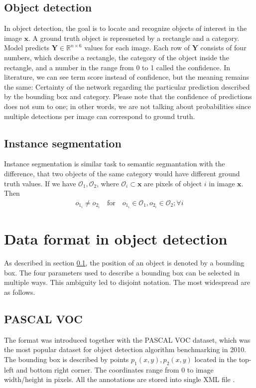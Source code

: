 \subsection{Object detection}
\label{subsec:object_detection}
In object detection, the goal is to locate and recognize objects of interest in the image $\mathbf{x}$. A ground truth object is represneted by a rectangle and a category. Model predicts $\mathbf{Y} \in \mathbb{R}^{n \times 6}$ values for each image. Each row of $\mathbf{Y}$ consists of four numbers, which describe a rectangle, the category of the object inside the rectangle, and a number in the range from 0 to 1 called the confidence. In literature, we can see term score instead of confidence, but the meaning remains the same: Certainty of the network regarding the particular prediction described by the bounding box and category. Please note that the confidence of predictions does not sum to one; in other words, we are not talking about probabilities since multiple detections per image can correspond to ground truth.

\subsection{Instance segmentation}
Instance segmentation is similar task to semantic segmantation with the difference, that two objects of the same category would have different ground truth values. If we have $\mathcal{O}_1, \mathcal{O}_2$, where $\mathcal{O}_i \subset \mathbf{x}$ are pixels of object $i$ in image $\mathbf{x}$. Then
\begin{align}
    o_{1_i} \neq o_{2_i} \quad \text{for} \quad o_{1_i} \in \mathcal{O}_1, o_{2_i} \in \mathcal{O}_2;\forall i
\end{align}

\section{Data format in object detection}
As described in section \ref{subsec:object_detection}, the position of an object is denoted by a bounding box.  The four parameters used to describe a bounding box can be selected in multiple ways. This ambiguity led to disjoint notation. The most widespread are as follows.
\subsection{PASCAL VOC}
The format was introduced together with the PASCAL VOC dataset, which was the most popular dataset for object detection algorithm benchmarking in 2010. The bounding box is described by points $p_1(x,y),p_2(x,y)$ located in the top-left and bottom right corner. The coordinates range from 0 to image width/height in pixels. All the annotations are stored into single XML file \cite{Everingham2009,Padilla2021}.

